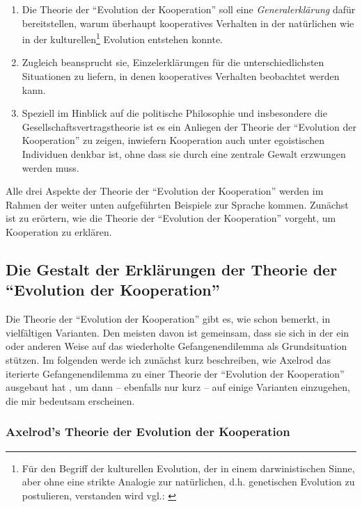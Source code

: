 \documentclass[12pt,a4paper,ngerman]{article}
\begin{document}
\begin{enumerate}

\item Die Theorie der "`Evolution der Kooperation"' soll eine
{\em Generalerklärung} dafür bereitstellen, warum überhaupt
kooperatives Verhalten in der natürlichen wie in der
kulturellen\footnote{Für den Begriff der kulturellen Evolution, der in
einem darwinistischen Sinne, aber ohne eine strikte Analogie zur
natürlichen, d.h. genetischen Evolution zu postulieren, verstanden
wird vgl.: \cite{schurz:2001}} Evolution entstehen konnte.

\item Zugleich beansprucht sie, Einzelerklärungen für die unterschiedlichsten
Situationen zu liefern, in denen kooperatives Verhalten beobachtet
werden kann.

\item Speziell im Hinblick auf die politische Philosophie und insbesondere die
Gesellschaftsvertragstheorie ist es ein Anliegen der Theorie der
"`Evolution der Kooperation"' zu zeigen, inwiefern Kooperation auch
unter egoistischen Individuen denkbar ist, ohne dass sie durch eine
zentrale Gewalt erzwungen werden muss.

\end{enumerate}

Alle drei Aspekte der Theorie der "`Evolution der Kooperation"' werden
im Rahmen der weiter unten aufgeführten Beispiele zur Sprache
kommen. Zunächst ist zu erörtern, wie die Theorie der "`Evolution der
Kooperation"' vorgeht, um Kooperation zu erklären.


\subsection{Die Gestalt der Erklärungen der Theorie der "`Evolution der
Kooperation"'}

Die Theorie der "`Evolution der Kooperation"' gibt es, wie schon
bemerkt, in vielfältigen Varianten. Den meisten davon ist gemeinsam, dass
sie sich in der ein oder anderen Weise auf das wiederholte
Gefangenendilemma als Grundsituation stützen. Im folgenden werde ich
zunächst kurz beschreiben, wie Axelrod das iterierte Gefangenendilemma
zu einer Theorie der "`Evolution der Kooperation"' ausgebaut
hat \cite{axelrod:1984}, um
dann -- ebenfalls nur kurz -- auf einige Varianten einzugehen, die mir
bedeutsam erscheinen.

\subsubsection{Axelrod's Theorie der Evolution der Kooperation}
\end{document}
